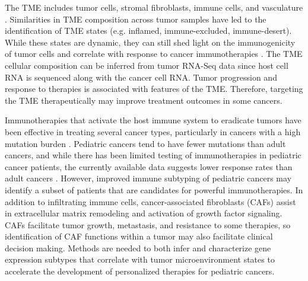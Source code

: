 \documentclass[10pt,letterpaper]{article}
\begin{document}
The TME includes tumor cells, stromal fibroblasts, immune cells, and vasculature \cite{joyceCellExclusionImmune2015}. Similarities in TME composition across tumor samples have led to the identification of TME states (e.g. inflamed, immune-excluded, immune-desert). While these states are dynamic, they can still shed light on the immunogenicity of tumor cells and correlate with response to cancer immunotherapies \cite{chenElementsCancerImmunity2017}. The TME cellular composition can be inferred from tumor RNA-Seq data since host cell RNA is sequenced along with the cancer cell RNA. Tumor progression and response to therapies is associated with features of the TME. Therefore, targeting the TME therapeutically may improve treatment outcomes in some cancers. 

Immunotherapies that activate the host immune system to eradicate tumors have been effective in treating several cancer types, particularly in cancers with a high mutation burden \cite{mellmanCancerImmunotherapyComes2011, pageImmuneModulationCancer2014}. Pediatric cancers tend to have fewer mutations than adult cancers, and while there has been limited testing of immunotherapies in pediatric cancer patients, the currently available data suggests lower response rates than adult cancers \cite{majzner2017harnessing,zamoraPediatricPatientsAcute2019}. However, improved immune subtyping of pediatric cancers may identify a subset of patients that are candidates for powerful immunotherapies. In addition to infiltrating immune cells, cancer-associated fibroblasts (CAFs) assist in extracellular matrix remodeling and activation of growth factor signaling. CAFs facilitate tumor growth, metastasis, and resistance to some therapies, so identification of CAF functions within a tumor may also facilitate clinical decision making. Methods are needed to both infer and characterize gene expression subtypes that correlate with tumor microenvironment states to accelerate the development of personalized therapies for pediatric cancers. 
\end{document}
